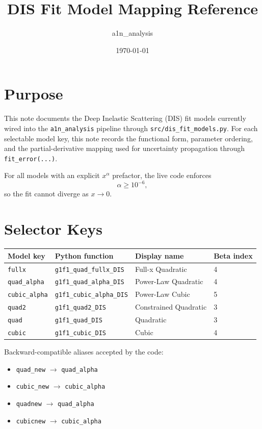 \documentclass[11pt]{article}
\title{DIS Fit Model Mapping Reference}
\author{a1n\_analysis}
\date{\today}
\begin{document}
\maketitle

\section{Purpose}

This note documents the Deep Inelastic Scattering (DIS) fit models currently
wired into the \texttt{a1n\_analysis} pipeline through
\texttt{src/dis\_fit\_models.py}.  For each selectable model key, this note
records the functional form, parameter ordering, and the partial-derivative
mapping used for uncertainty propagation through \texttt{fit\_error(...)}.

For all models with an explicit $x^\alpha$ prefactor, the live code enforces
\[
\alpha \ge 10^{-6},
\]
so the fit cannot diverge as $x \to 0$.

\section{Selector Keys}

\begin{longtable}{llll}
\toprule
Model key & Python function & Display name & Beta index \\
\midrule
\texttt{fullx}        & \texttt{g1f1\_quad\_fullx\_DIS}   & Full-x Quadratic      & 4 \\
\texttt{quad\_alpha}  & \texttt{g1f1\_quad\_alpha\_DIS}   & Power-Law Quadratic   & 4 \\
\texttt{cubic\_alpha} & \texttt{g1f1\_cubic\_alpha\_DIS}  & Power-Law Cubic       & 5 \\
\texttt{quad2}        & \texttt{g1f1\_quad2\_DIS}         & Constrained Quadratic & 3 \\
\texttt{quad}         & \texttt{g1f1\_quad\_DIS}          & Quadratic             & 3 \\
\texttt{cubic}        & \texttt{g1f1\_cubic\_DIS}         & Cubic                 & 4 \\
\bottomrule
\end{longtable}

Backward-compatible aliases accepted by the code:
\begin{itemize}
\item \texttt{quad\_new} $\rightarrow$ \texttt{quad\_alpha}
\item \texttt{cubic\_new} $\rightarrow$ \texttt{cubic\_alpha}
\item \texttt{quadnew} $\rightarrow$ \texttt{quad\_alpha}
\item \texttt{cubicnew} $\rightarrow$ \texttt{cubic\_alpha}
\end{itemize}
\end{document}
